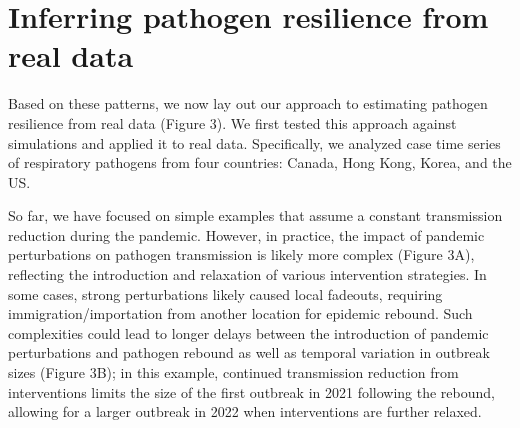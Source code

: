 \documentclass[12pt]{article}
\begin{document}
\section*{Inferring pathogen resilience from real data}

Based on these patterns, we now lay out our approach to estimating pathogen resilience from real data (Figure 3).
We first tested this approach against simulations and applied it to real data.
Specifically, we analyzed case time series of respiratory pathogens from four countries: Canada, Hong Kong, Korea, and the US.

So far, we have focused on simple examples that assume a constant transmission reduction during the pandemic.
However, in practice, the impact of pandemic perturbations on pathogen transmission is likely more complex (Figure 3A), reflecting the introduction and relaxation of various intervention strategies.
In some cases, strong perturbations likely caused local fadeouts, requiring immigration/importation from another location for epidemic rebound.
Such complexities could lead to longer delays between the introduction of pandemic perturbations and pathogen rebound as well as temporal variation in outbreak sizes (Figure 3B);
in this example, continued transmission reduction from interventions limits the size of the first outbreak in 2021 following the rebound, allowing for a larger outbreak in 2022 when interventions are further relaxed.
\end{document}
